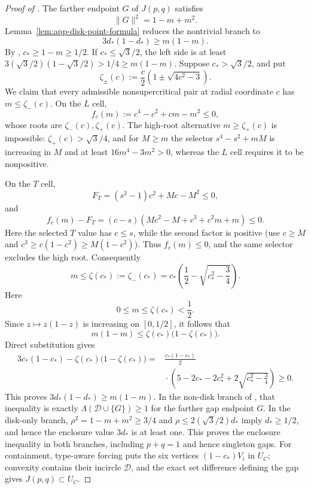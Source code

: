 \begin{proof}[Proof of ]
The farther endpoint $G$ of $J(p,q)$ satisfies
\[
 \lVert G\rVert^2=1-m+m^2.
\]
Lemma~\ref{lem:app-disk-point-formula} reduces the nontrivial branch to
\[
 3d_*(1-d_*)\ge m(1-m).
\]
By , $c_*\ge1-m\ge1/2$.  If
$c_*\le\sqrt3/2$, the left side is at least
$3(\sqrt3/2)(1-\sqrt3/2)>1/4\ge m(1-m)$.  Suppose
$c_*>\sqrt3/2$, and put
\[
 \zeta_\pm(c):=\frac c2\left(1\pm\sqrt{4c^2-3}\right).
\]
We claim that every admissible nonsupercritical pair at radial coordinate
$c$ has $m\le\zeta_-(c)$.  On the $L$ cell,
\[
 f_c(m):=c^4-c^2+cm-m^2\le0,
\]
whose roots are $\zeta_-(c),\zeta_+(c)$.  The high-root alternative
$m\ge\zeta_+(c)$ is impossible: $\zeta_+(c)>\sqrt3/4$, and for
$M\ge m$ the selector $s^4-s^2+mM$ is increasing in $M$ and at least
$16m^4-3m^2>0$, whereas the $L$ cell requires it to be nonpositive.

On the $T$ cell,
\[
 F_T=(s^2-1)c^2+Mc-M^2\le0,
\]
and
\[
 f_c(m)-F_T
 =(c-s)(Mc^2-M+c^3+c^2m+m)\le0.
\]
Here the selected $T$ value has $c\le s$, while the second factor is
positive (use $c\ge M$ and
$c^3\ge c(1-c^2)\ge M(1-c^2)$).  Thus $f_c(m)\le0$, and the same selector
excludes the high root.  Consequently
\[
 m\le\zeta(c_*):=\zeta_-(c_*)
 =c_*\left(\frac12-\sqrt{c_*^2-\frac34}\right).
\]
Here
\[
 0\le m\le\zeta(c_*)<\frac12.
\]
Since $z\mapsto z(1-z)$ is increasing on $[0,1/2]$, it follows that
\[
 m(1-m)\le\zeta(c_*)\bigl(1-\zeta(c_*)\bigr).
\]
Direct substitution gives
\[
\begin{aligned}
3c_*(1-c_*)-\zeta(c_*)\bigl(1-\zeta(c_*)\bigr)
={}&\frac{c_*(1-c_*)}{2}\\
&\mathrel{}\cdot
\left(5-2c_*-2c_*^2+2\sqrt{c_*^2-\frac34}\right)\ge0.
\end{aligned}
\]
This proves $3d_*(1-d_*)\ge m(1-m)$.  In the non-disk branch of
, that inequality is exactly
$\Lambda(\mathcal D\cup\{G\})\ge1$ for the farther gap endpoint $G$.  In
the disk-only branch, $\rho^2=1-m+m^2\ge3/4$ and
$\rho\le2(\sqrt3/2)d_*$ imply $d_*\ge1/2$, and hence the enclosure value
$3d_*$ is at least one.  This proves the enclosure
inequality in both branches, including $p+q=1$ and hence singleton gaps.
For containment, type-aware forcing puts the six vertices
$(1-c_*)V_i$ in $U_C$; convexity contains their incircle $\mathcal D$, and
the exact set difference defining the gap gives $J(p,q)\subset U_C$.
\end{proof}

